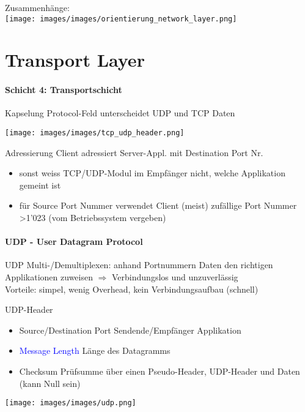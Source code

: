 \begin{KR}{Zusammenhänge:}\\
    \texttt{[image: images/images/orientierung\_network\_layer.png]}
    \end{KR}

\section{Transport Layer}
\paragraph{Schicht 4: Transportschicht}

\begin{definition}{Kapselung} Protocol-Feld unterscheidet UDP und TCP Daten
    
    \texttt{[image: images/images/tcp\_udp\_header.png]}
\end{definition}

\begin{concept}{Adressierung}
    {\small Client adressiert Server-Appl. mit Destination Port Nr.}
    \begin{itemize}
        \item sonst weiss TCP/UDP-Modul im Empfänger nicht, welche Applikation gemeint ist
        \item für Source Port Nummer verwendet Client (meist) zufällige Port Nummer >1'023 (vom Betriebssystem vergeben)
    \end{itemize}
\end{concept}

\paragraph{UDP - User Datagram Protocol}

\begin{definition}{UDP}
    Multi-/Demultiplexen: anhand Portnummern Daten den richtigen Applikationen zuweisen
    $\Rightarrow$ Verbindungslos und unzuverlässig\\
    {\small Vorteile: simpel, wenig Overhead, kein Verbindungsaufbau (schnell)}
\end{definition}

\begin{concept}{UDP-Header}
    \begin{itemize}
        \item \textcolor{darkfrog}{Source/Destination Port} Sendende/Empfänger Applikation
        \item \textcolor{blue}{Message Length} Länge des Datagramms
        \item \textcolor{darkpurple}{Checksum} Prüfsumme über einen Pseudo-Header, UDP-Header und Daten (kann Null sein)
    \end{itemize}
        \texttt{[image: images/images/udp.png]}
\end{concept}


